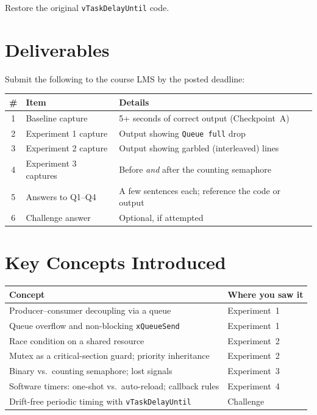 \documentclass[11pt, a4paper]{article}
\newcommand{\api}[1]{\texttt{\small #1}}
\begin{document}
Restore the original \api{vTaskDelayUntil} code.

\section{Deliverables}

Submit the following to the course LMS by the posted deadline:

\renewcommand{\arraystretch}{1.3}
\begin{tabular}{@{} c p{4.2cm} p{7.8cm} @{}}
  \toprule
  \textbf{\#} & \textbf{Item} & \textbf{Details} \\
  \midrule
  1 & Baseline capture     & 5+ seconds of correct output (Checkpoint~A) \\
  2 & Experiment 1 capture & Output showing \texttt{Queue full} drop \\
  3 & Experiment 2 capture & Output showing garbled (interleaved) lines \\
  4 & Experiment 3 captures & Before \emph{and} after the counting semaphore \\
  5 & Answers to Q1--Q4    & A few sentences each; reference the code or output \\
  6 & Challenge answer     & Optional, if attempted \\
  \bottomrule
\end{tabular}
\renewcommand{\arraystretch}{1}

\section{Key Concepts Introduced}

\renewcommand{\arraystretch}{1.3}
\begin{tabular}{@{} p{7.2cm} p{6.3cm} @{}}
  \toprule
  \textbf{Concept} & \textbf{Where you saw it} \\
  \midrule
  Producer--consumer decoupling via a queue       & Experiment~1 \\
  Queue overflow and non-blocking \api{xQueueSend}& Experiment~1 \\
  Race condition on a shared resource             & Experiment~2 \\
  Mutex as a critical-section guard; priority inheritance & Experiment~2 \\
  Binary vs.\ counting semaphore; lost signals    & Experiment~3 \\
  Software timers: one-shot vs.\ auto-reload; callback rules & Experiment~4 \\
  Drift-free periodic timing with \api{vTaskDelayUntil} & Challenge \\
  \bottomrule
\end{tabular}
\renewcommand{\arraystretch}{1}
\end{document}
